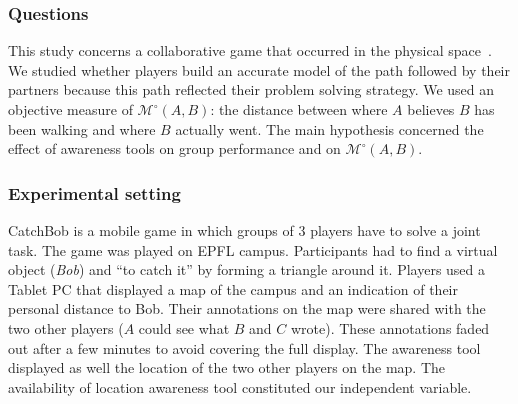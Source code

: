 \documentclass[twocolumn]{article}
\newcommand{\gModel}[2]{{$\mathcal{M}^{\circ}(#1, #2)$}}
\begin{document}
\subsubsection*{Questions}

This study concerns a collaborative game that occurred in the physical
space~\citep{nova2006underwhelming}. We studied whether players build an accurate
model of the path followed by their partners because this path reflected their
problem solving strategy. We used an objective measure of \gModel{A}{B}: the
distance between where $A$ believes $B$ has been walking and where $B$ actually went.
The main hypothesis concerned the effect of awareness tools on group performance
and on \gModel{A}{B}. 

\subsubsection*{Experimental setting}

{\sc CatchBob} is a mobile game in which groups of 3 players have to solve a
joint task. The game was played on EPFL campus. Participants had to find a
virtual object (\emph{Bob}) and ``to catch it'' by forming a triangle around it.
Players used a Tablet PC that displayed a map of the campus and an indication of
their personal distance to Bob. Their annotations on the map were shared with
the two other players ($A$ could see what $B$ and $C$ wrote). These annotations faded
out after a few minutes to avoid covering the full display. The awareness tool
displayed as well the location of the two other players on the map. The
availability of location awareness tool constituted our independent variable.
\end{document}
